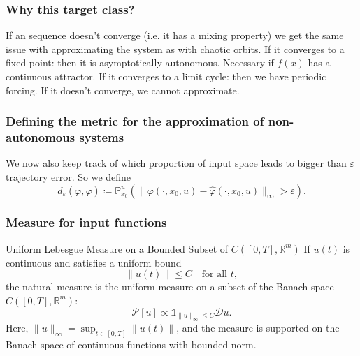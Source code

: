 \documentclass{article}
\theoremstyle{definition} \newtheorem{definition}{Definition}
\theoremstyle{remark} \newtheorem{remark}{Remark}
\newcommand{\reals}{\mathbb{R}}
\newcounter{ct}
\begin{document}
\subsubsection{Why this target class?}
If an sequence doesn't converge (i.e. it has a mixing property) we get the same issue with approximating the system as with chaotic orbits.
If it converges to a fixed point: then it is asymptotically autonomous. Necessary if $f(x)$ has a continuous attractor.
If it converges to a limit cycle: then we have periodic forcing. 
If it doesn't converge, we cannot approximate.  



\subsubsection{Defining the metric for the approximation of non-autonomous systems}\label{sec:inputdriven_metric}
We now also keep track of which proportion of input space leads to bigger than $\varepsilon$ trajectory error.
So we define 
\begin{equation}%
d_\varepsilon(\varphi,\hat \varphi) \coloneqq  \mathbb{P}_{x_0}^{u}\left(\|\varphi(\cdot,x_0,u)-\hat \varphi(\cdot,x_0,u)\|_\infty>\varepsilon\right).
\end{equation}


\subsubsection{Measure for input functions}%
Uniform Lebesgue Measure on a Bounded Subset of \( C([0,T], \reals^m) \)
If \( u(t) \) is continuous and satisfies a uniform bound
\[
\|u(t)\| \leq C \quad \text{for all } t,
\]
the natural measure is the uniform measure on a subset of the Banach space \( C([0,T], \reals^m) \):
\[
\mathcal{P}[u] \propto \mathds{1}_{\|u\|_\infty \leq C} \mathcal{D} u.
\]
Here, \( \|u\|_\infty = \sup_{t \in [0,T]} \|u(t)\| \), and the measure is supported on the Banach space of continuous functions with bounded norm.
\end{document}
